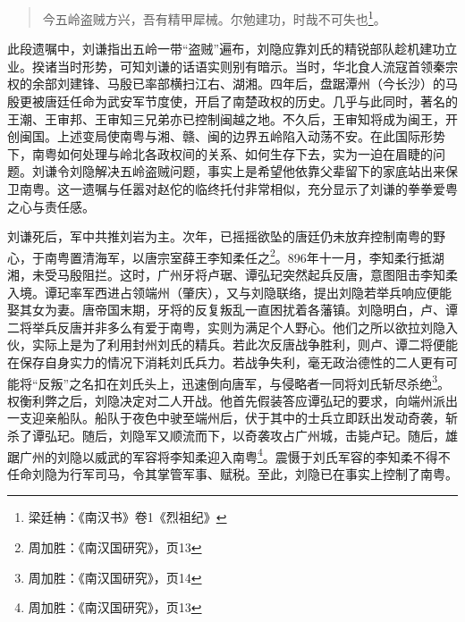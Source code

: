 \begin{quote}

今五岭盗贼方兴，吾有精甲犀械。尔勉建功，时哉不可失也\footnote{梁廷柟：《南汉书》卷1《烈祖纪》}。
\end{quote}

此段遗嘱中，刘谦指出五岭一带“盗贼”遍布，刘隐应靠刘氏的精锐部队趁机建功立业。揆诸当时形势，可知刘谦的话语实则别有暗示。当时，华北食人流寇首领秦宗权的余部刘建锋、马殷已率部横扫江右、湖湘。四年后，盘踞潭州（今长沙）的马殷更被唐廷任命为武安军节度使，开启了南楚政权的历史。几乎与此同时，著名的王潮、王审邦、王审知三兄弟亦已控制闽越之地。不久后，王审知将成为闽王，开创闽国。上述变局使南粤与湘、赣、闽的边界五岭陷入动荡不安。在此国际形势下，南粤如何处理与岭北各政权间的关系、如何生存下去，实为一迫在眉睫的问题。刘谦令刘隐解决五岭盗贼问题，事实上是希望他依靠父辈留下的家底站出来保卫南粤。这一遗嘱与任嚣对赵佗的临终托付非常相似，充分显示了刘谦的拳拳爱粤之心与责任感。

刘谦死后，军中共推刘岩为主。次年，已摇摇欲坠的唐廷仍未放弃控制南粤的野心，于南粤置清海军，以唐宗室薛王李知柔任之\footnote{周加胜：《南汉国研究》，页13}。896年十一月，李知柔行抵湖湘，未受马殷阻拦。这时，广州牙将卢琚、谭弘玘突然起兵反唐，意图阻击李知柔入境。谭玘率军西进占领端州（肇庆），又与刘隐联络，提出刘隐若举兵响应便能娶其女为妻。唐帝国末期，牙将的反复叛乱一直困扰着各藩镇。刘隐明白，卢、谭二将举兵反唐并非多么有爱于南粤，实则为满足个人野心。他们之所以欲拉刘隐入伙，实际上是为了利用封州刘氏的精兵。若此次反唐战争胜利，则卢、谭二将便能在保存自身实力的情况下消耗刘氏兵力。若战争失利，毫无政治德性的二人更有可能将“反叛”之名扣在刘氏头上，迅速倒向唐军，与侵略者一同将刘氏斩尽杀绝\footnote{周加胜：《南汉国研究》，页14}。权衡利弊之后，刘隐决定对二人开战。他首先假装答应谭弘玘的要求，向端州派出一支迎亲船队。船队于夜色中驶至端州后，伏于其中的士兵立即跃出发动奇袭，斩杀了谭弘玘。随后，刘隐军又顺流而下，以奇袭攻占广州城，击毙卢玘。随后，雄踞广州的刘隐以威武的军容将李知柔迎入南粤\footnote{周加胜：《南汉国研究》，页13}。震慑于刘氏军容的李知柔不得不任命刘隐为行军司马，令其掌管军事、赋税。至此，刘隐已在事实上控制了南粤。

